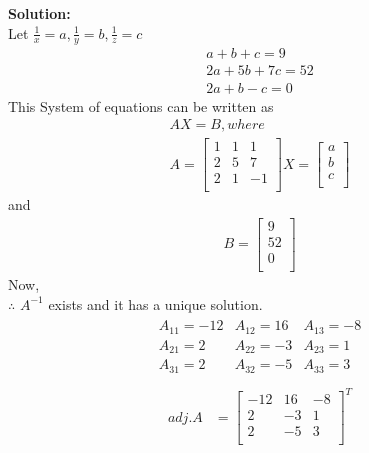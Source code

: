 \documentclass[journal,two column]{IEEEtran}
\begin{document}
\begin{LARGE}
\textbf{
Solution:}\\
Let $ \frac{1}{x} = a,\frac{1}{y} = b,\frac{1}{z} = c $       
\begin{align}
 a+b+c=9\\
 2a+5b+7c=52\\
 2a+b-c=0
\end{align}
This System of equations can be written as\\
\begin{align}
AX = B,where\\
  A = {\begin{bmatrix}
      1 & 1 & 1 \\
      2 & 5 & 7\\
      2 & 1 & -1 \\
     \end{bmatrix}}
  X = {\begin{bmatrix}
       a\\
       b\\
       c\\
       \end{bmatrix}}
\end{align}       
and
\begin{align}
B = {\begin{bmatrix}
   9\\
   52\\
   0\\
   \end{bmatrix}}
\end{align}
Now,\\
$\therefore$
$A^{-1}$ exists and it has a unique solution.\\
\begin{align*}
\begin{matrix}
A_{11} = -12 & A_{12} = 16 & A_{13} = -8\\
A_{21} = 2   & A_{22} = -3 & A_{23} = 1\\
A_{31} = 2   & A_{32} = -5 & A_{33} = 3\\
\end{matrix}
\end{align*}
\begin{align}
adj.A &= {\begin{bmatrix}
         -12 & 16 &-8\\
           2 & -3 & 1\\
           2 & -5 & 3\\
           \end{bmatrix}}^{T}\\

\end{align}
\end{LARGE}
\end{document}
